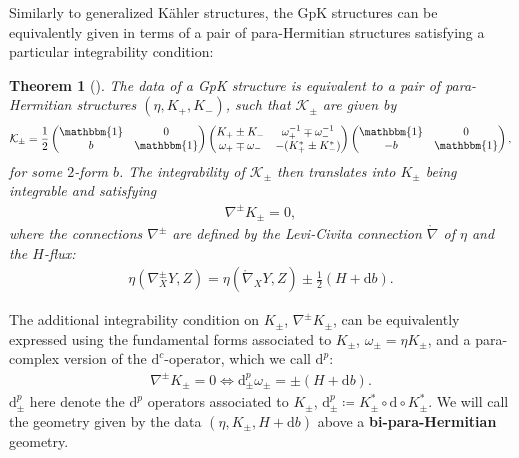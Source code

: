 \documentclass[letterpaper,12pt]{article}
\newcommand{\KK}{\mathcal{K}}
\newcommand{\id}{\mathbbm{1}}
\newcommand{\lc}{\mathring{\n}}
\newcommand{\n}{\nabla}
\newcommand{\rd}{\mathrm{d}}
\newtheorem{theorem}{Theorem}[section]
\theoremstyle{definition}
\theoremstyle{remark}
\theoremstyle{examples}
\begin{document}
Similarly to generalized K\"ahler structures, the GpK structures can be equivalently given in terms of a pair of para-Hermitian structures satisfying a particular integrability condition:
\begin{theorem}[\cite{Hu:2019zro}]
The data of a GpK structure is equivalent to a pair of para-Hermitian structures $(\eta,K_+,K_-)$, such that $\KK_\pm$ are given by
\begin{align}\label{eq:GpK_genform}
\KK_{\pm}=\frac{1}{2}
\begin{pmatrix}
\id & 0 \\
b & \id
\end{pmatrix}
\begin{pmatrix}
K_+\pm K_- & \omega^{-1}_+\mp \omega^{-1}_- \\
\omega_+\mp \omega_- & -(K_+^*\pm K_-^*)
\end{pmatrix}
\begin{pmatrix}
\id & 0 \\
-b & \id
\end{pmatrix},
\end{align}
for some $2$-form $b$. The integrability of $\KK_\pm$ then translates into $K_\pm$ being integrable and satisfying
\begin{align*}
\n^\pm K_\pm=0,
\end{align*}
where the connections $\n^\pm$ are defined by the Levi-Civita connection $\lc$ of $\eta$ and the $H$-flux:
\begin{align*}
\eta(\n^\pm_XY,Z)=\eta(\lc_XY,Z)\pm\frac{1}{2}(H+\rd b).
\end{align*}
\end{theorem}

The additional integrability condition on $K_\pm$, $\n^\pm K_\pm$, can be equivalently expressed using the fundamental forms associated to $K_\pm$, $\omega_\pm=\eta K_\pm$, and a para-complex version of the $\rd^c$-operator, which we call $\rd^p$:
\begin{align*}
\n^\pm K_\pm=0 \Longleftrightarrow \rd^p_\pm\omega_\pm=\pm (H+\rd b).
\end{align*}
$\rd^p_\pm$ here denote the $\rd^p$ operators associated to $K_\pm$, $\rd^p_\pm\coloneqq K_\pm^*\circ \rd\circ K_\pm^*$. We will call the geometry given by the data $(\eta, K_\pm, H+\rd b)$ above a {\bf bi-para-Hermitian} geometry.
\end{document}
